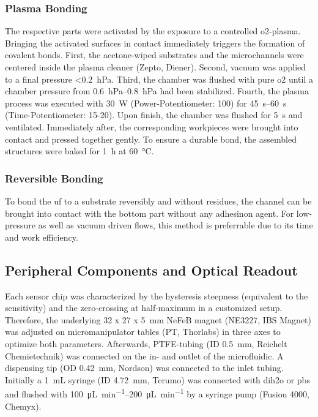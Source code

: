\subsubsection{Plasma Bonding}
\label{sec:meth:bond:plasma}
The respective parts were activated by the exposure to a controlled \gls{o2}-plasma. Bringing the activated surfaces in contact immediately triggers the formation of covalent bonds. First, the acetone-wiped substrates and the microchannels were centered inside the plasma cleaner (Zepto, Diener). Second, vacuum was applied to a final pressure <\SI{0.2}{\hecto\pascal}. Third, the chamber was flushed with pure \gls{o2} until a chamber pressure from \SIrange{0.6}{0.8}{\hecto\pascal} had been stabilized. Fourth, the plasma process was executed with \SI{30}{\watt} (Power-Potentiometer: 100) for \SIrange{45}{60}{\second} (Time-Potentiometer: 15-20). Upon finish, the chamber was flushed for \SI{5}{\second} and ventilated. Immediately after, the corresponding workpieces were brought into contact and pressed together gently. To ensure a durable bond, the assembled structures were baked for \SI{1}{\hour} at \SI{60}{\degreeCelsius}.



\subsubsection{Reversible Bonding}
To bond the \gls{uf} to a substrate reversibly and without residues, the channel can be brought into contact with the bottom part without any adhesinon agent. For low-pressure as well as vacuum driven flows, this method is preferrable due to its time and work efficiency.

\subsection{Peripheral Components and Optical Readout}
Each sensor chip was characterized by the hysteresis steepness (equivalent to the sensitivity) and the zero-crossing at half-maximum in a customized setup. Therefore, the underlying 32 x 27 x \SI{5}{\milli\meter} NeFeB magnet (NE3227, IBS Magnet) was adjusted on micromanipulator tables (PT, Thorlabs) in three axes to optimize both parameters. Afterwards, PTFE-tubing (ID \SI{0.5}{\milli\meter}, Reichelt Chemietechnik) was connected on the in- and outlet of the microfluidic. A dispensing tip (OD \SI{0.42}{\milli\meter}, Nordson) was connected to the inlet tubing. Initially a \SI{1}{\milli\liter} syringe (ID \SI{4.72}{\milli\meter}, Terumo) was connected with \gls{dih2o} or \gls{pbs} and flushed with \SIrange{100}{200}{\micro\liter\per\minute} by a syringe pump (Fusion 4000, Chemyx).
